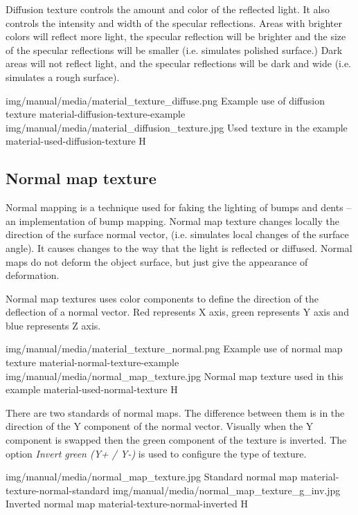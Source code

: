 Diffusion texture controls the amount and color of the reflected light. It also controls the intensity and width of the specular reflections.
Areas with brighter colors will reflect more light, the specular reflection will be brighter and the size of the specular reflections will be smaller (i.e. simulates polished surface.)
Dark areas will not reflect light, and the specular reflections will be dark and wide (i.e. simulates a rough surface). 

\twoImagesWithTwoCaptionsFullWidth
{img/manual/media/material_texture_diffuse.png}
{Example use of diffusion texture}
{material-diffusion-texture-example}
{img/manual/media/material_diffusion_texture.jpg}
{Used texture in the example}
{material-used-diffusion-texture}
{H}

\subsection{Normal map texture}\label{materials-normal-map-texture}

Normal mapping is a technique used for faking the lighting of bumps and dents – an implementation of bump mapping. Normal map texture changes locally the direction of the surface normal vector, (i.e. simulates local changes of the surface angle). It causes changes to the way that the light is reflected or diffused. Normal maps do not deform the object surface, but just give the appearance of deformation.

Normal map textures uses color components to define the direction of the deflection of a normal vector. Red represents X axis, green represents Y axis and blue represents Z axis. 

\twoImagesWithTwoCaptionsFullWidth
{img/manual/media/material_texture_normal.png}
{Example use of normal map texture}
{material-normal-texture-example}
{img/manual/media/normal_map_texture.jpg}
{Normal map texture used in this example}
{material-used-normal-texture}
{H}

There are two standards of normal maps. The difference between them is in the direction of the Y component of the normal vector. Visually when the Y component is swapped then the green component of the texture is inverted. The option \emph{Invert green (Y+ / Y-)} is used to configure the type of texture.

\twoImagesWithTwoCaptionsFullWidth
{img/manual/media/normal_map_texture.jpg}
{Standard normal map}
{material-texture-normal-standard}
{img/manual/media/normal_map_texture_g_inv.jpg}
{Inverted normal map}
{material-texture-normal-inverted}
{H}

